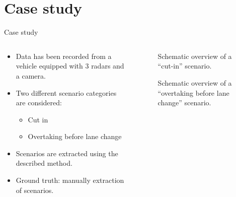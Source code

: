\documentclass[aspectratio=\AspectR,10pt,corporate]{beamer} %
\newlength\figurewidth
\begin{document}
\section{Case study}
\begin{frame}{Case study}
	\begin{columns}
		\begin{column}{0.5\textwidth}
			\begin{itemize}
				\item Data has been recorded from a vehicle equipped with 3 radars and a camera.
				\item Two different scenario categories are considered:
				\begin{itemize}
					\item Cut in 
					\item Overtaking before lane change
				\end{itemize}
				\item Scenarios are extracted using the described method.
				\item Ground truth: manually extraction of scenarios.
			\end{itemize}
		\end{column}
		\begin{column}{0.5\textwidth}  %
			\vspace{-5em}
			\begin{figure}
				\setlength{\figurewidth}{\textwidth}
				
				\vspace{-2em}
				\caption{Schematic overview of a ``cut-in'' scenario.}
			\end{figure}
			\vspace{-3em}
			\begin{figure}
				\setlength{\figurewidth}{\textwidth}
				
				\vspace{-2em}
				\caption{Schematic overview of a ``overtaking before lane change'' scenario.}
			\end{figure}
		\end{column}
	\end{columns}
\end{frame}
\end{document}
